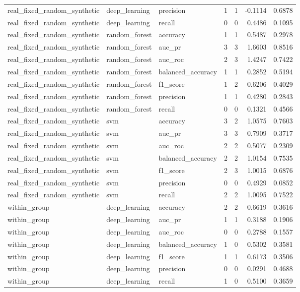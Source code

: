 \begin{tabular}{lllllrr}
real_fixed_random_synthetic & deep_learning & precision & 1 & 1 & -0.1114 & 0.6878 \\
real_fixed_random_synthetic & deep_learning & recall & 0 & 0 & 0.4486 & 0.1095 \\
real_fixed_random_synthetic & random_forest & accuracy & 1 & 1 & 0.5487 & 0.2978 \\
real_fixed_random_synthetic & random_forest & auc_pr & 3 & 3 & 1.6603 & 0.8516 \\
real_fixed_random_synthetic & random_forest & auc_roc & 2 & 3 & 1.4247 & 0.7422 \\
real_fixed_random_synthetic & random_forest & balanced_accuracy & 1 & 1 & 0.2852 & 0.5194 \\
real_fixed_random_synthetic & random_forest & f1_score & 1 & 2 & 0.6206 & 0.4029 \\
real_fixed_random_synthetic & random_forest & precision & 1 & 1 & 0.4280 & 0.2843 \\
real_fixed_random_synthetic & random_forest & recall & 0 & 0 & 0.1321 & 0.4566 \\
real_fixed_random_synthetic & svm & accuracy & 3 & 2 & 1.0575 & 0.7603 \\
real_fixed_random_synthetic & svm & auc_pr & 3 & 3 & 0.7909 & 0.3717 \\
real_fixed_random_synthetic & svm & auc_roc & 2 & 2 & 0.5077 & 0.2309 \\
real_fixed_random_synthetic & svm & balanced_accuracy & 2 & 2 & 1.0154 & 0.7535 \\
real_fixed_random_synthetic & svm & f1_score & 2 & 3 & 1.0015 & 0.6876 \\
real_fixed_random_synthetic & svm & precision & 0 & 0 & 0.4929 & 0.0852 \\
real_fixed_random_synthetic & svm & recall & 2 & 2 & 1.0095 & 0.7522 \\
within_group & deep_learning & accuracy & 2 & 2 & 0.6619 & 0.3616 \\
within_group & deep_learning & auc_pr & 1 & 1 & 0.3188 & 0.1906 \\
within_group & deep_learning & auc_roc & 0 & 0 & 0.2788 & 0.1557 \\
within_group & deep_learning & balanced_accuracy & 1 & 0 & 0.5302 & 0.3581 \\
within_group & deep_learning & f1_score & 1 & 1 & 0.6173 & 0.3506 \\
within_group & deep_learning & precision & 0 & 0 & 0.0291 & 0.4688 \\
within_group & deep_learning & recall & 1 & 0 & 0.5100 & 0.3659 \\

\end{tabular}
